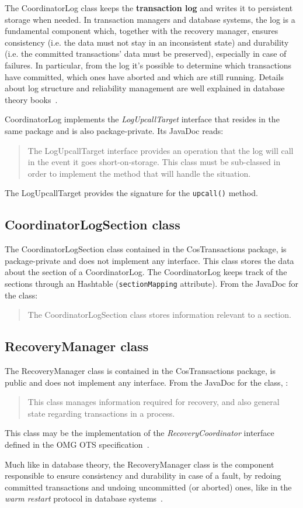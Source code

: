 The CoordinatorLog class keeps the \textbf{transaction log} and writes it to persistent storage when needed. In transaction managers and database systems, the log is a fundamental component which, together with the recovery manager, ensures consistency (i.e. the data must not stay in an inconsistent state) and durability (i.e. the committed transactions' data must be preserved), especially in case of failures.
In particular, from the log it's possible to determine which transactions have committed, which ones have aborted and which are still running.
Details about log structure and reliability management are well explained in database theory books~\cite{ceri-dbbook}.

CoordinatorLog implements the \emph{LogUpcallTarget} interface that resides in the same package and is also package-private. Its JavaDoc reads:
\begin{quote}
    The LogUpcallTarget interface provides an operation that the log will call in the event it goes short-on-storage. This class must be sub-classed in order to implement the method that will handle the situation.
\end{quote}
The LogUpcallTarget provides the signature for the \texttt{upcall()} method.

\subsection{CoordinatorLogSection class}
The CoordinatorLogSection class contained in the CosTransactions package, is package-private and does not implement any interface.
This class stores the data about the section of a CoordinatorLog.
The CoordinatorLog keeps track of the sections through an Hashtable (\texttt{sectionMapping} attribute).
From the JavaDoc for the class:
\begin{quote}
The CoordinatorLogSection class stores information relevant to a section.
\end{quote}

\subsection{RecoveryManager class}
The RecoveryManager class is contained in the CosTransactions package, is public and does not implement any interface. From the JavaDoc for the class, :
\begin{quote}
    This class manages information required for recovery, and also general state regarding transactions in a process.
\end{quote}

This class may be the implementation of the \emph{RecoveryCoordinator} interface defined in the OMG OTS specification~\cite[p. 47]{omg-ots}.

Much like in database theory, the RecoveryManager class is the component responsible to ensure consistency and durability in case of a fault, by redoing committed transactions and undoing uncommitted (or aborted) ones, like in the \emph{warm restart} protocol in database systems~\cite[p.~319]{ceri-dbbook}.
